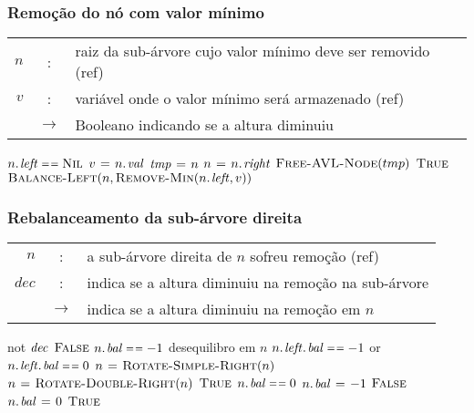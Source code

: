 \documentclass{beamer}
\begin{document}
\begin{frame}
\frametitle{Remoção do nó com valor mínimo}

\begin{tabular}{rcl}
$n$ & : & raiz da sub-árvore cujo valor mínimo deve ser removido (ref) \\
$v$ & : & variável onde o valor mínimo será armazenado (ref) \\
& $\rightarrow$ & Booleano indicando se a altura diminuiu
\end{tabular}

\begin{codebox}
\li \If $\attrib{n}{left} \isequal \const{Nil}$
\li \Then
      $v \gets \attrib{n}{val}$
\li   $\id{tmp} \gets n$
\li   $n \gets \attrib{n}{right}$
\li   $\textnormal{\scshape Free-AVL-Node}(tmp)$
\li   \Return $\textnormal{\scshape True}$
\li \Else
\li   \Return $\proc{Balance-Left}(n, \proc{Remove-Min}(\attrib{n}{left}, v))$
    \End  
\end{codebox}

\end{frame}

\begin{frame}
\frametitle{Rebalanceamento da sub-árvore direita}

\begin{small}
\begin{tabular}{rcl}
$n$ & : & a sub-árvore direita de $n$ sofreu remoção (ref) \\
$dec$ & : & indica se a altura diminuiu na remoção na sub-árvore \\
& $\rightarrow$ & indica se a altura diminuiu na remoção em $n$
\end{tabular}

\begin{codebox}
\li \If not $\id{dec}$
\li \Then \Return $\textnormal{\scshape False}$
    \End
\li \If $\attrib{n}{bal} \isequal -1$ \> \> \> \> \> \Comment desequilibro em $n$
\li \Then
      \If $\attrib{\attrib{n}{left}}{bal} \isequal -1$ or
          $\attrib{\attrib{n}{left}}{bal} \isequal 0$
\li   \Then
        $n \mathrel{\hspace{1pt}=\hspace{1pt}} \textnormal{\scshape Rotate-Simple-Right}(n)$
\li   \ElseNoIf 
        $n \mathrel{\hspace{1pt}=\hspace{1pt}} \textnormal{\scshape Rotate-Double-Right}(n)$
      \End
\li   \Return $\textnormal{\scshape True}$
\li \ElseIf $\attrib{n}{bal} \isequal 0$
\li \Then
      $\attrib{n}{bal} \gets -1$
\li   \Return $\textnormal{\scshape False}$
\li \ElseNoIf
      $\attrib{n}{bal} \gets 0$
\li   \Return $\textnormal{\scshape True}$
    \End
\end{codebox}
\end{small}

\end{frame}
\end{document}
